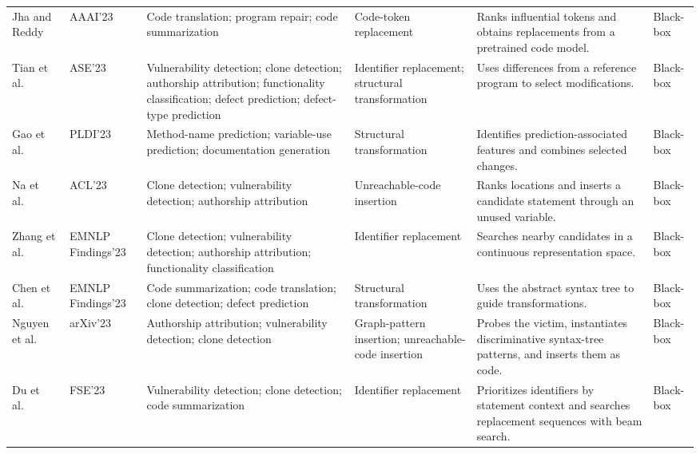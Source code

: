 \documentclass[acmsmall,screen,review]{acmart}
\begin{document}
{\begin{longtable}{@{}L{2.1cm}L{1.5cm}L{2.30cm}L{2.50cm}L{3.50cm}L{1.35cm}@{}}
Jha and Reddy~\cite{jha2023codeattack} &
AAAI'23 &
Code translation; program repair; code summarization &
Code-token replacement &
Ranks influential tokens and obtains replacements from a pretrained code model. &
Black-box \\

Tian et al.~\cite{tian2023coda} &
ASE'23 &
Vulnerability detection; clone detection; authorship attribution; functionality classification; defect prediction; defect-type prediction &
Identifier replacement; structural transformation &
Uses differences from a reference program to select modifications. &
Black-box \\

Gao et al.~\cite{gao2023dak} &
PLDI'23 &
Method-name prediction; variable-use prediction; documentation generation &
Structural transformation &
Identifies prediction-associated features and combines selected changes. &
Black-box \\

Na et al.~\cite{na2023dip} &
ACL'23 &
Clone detection; vulnerability detection; authorship attribution &
Unreachable-code insertion &
Ranks locations and inserts a candidate statement through an unused variable. &
Black-box \\

Zhang et al.~\cite{zhang2023rnns} &
EMNLP Findings'23 &
Clone detection; vulnerability detection; authorship attribution; functionality classification &
Identifier replacement &
Searches nearby candidates in a continuous representation space. &
Black-box \\

Chen et al.~\cite{chen2023structure} &
EMNLP Findings'23 &
Code summarization; code translation; clone detection; defect prediction &
Structural transformation &
Uses the abstract syntax tree to guide transformations. &
Black-box \\

Nguyen et al.~\cite{nguyen2023graphcodeattack} &
arXiv'23 &
Authorship attribution; vulnerability detection; clone detection &
Graph-pattern insertion; unreachable-code insertion &
Probes the victim, instantiates discriminative syntax-tree patterns, and inserts them as code. &
Black-box \\

Du et al.~\cite{gu2023beamattack} &
FSE'23 &
Vulnerability detection; clone detection; code summarization &
Identifier replacement &
Prioritizes identifiers by statement context and searches replacement sequences with beam search. &
Black-box \\


\end{longtable}}
\end{document}
